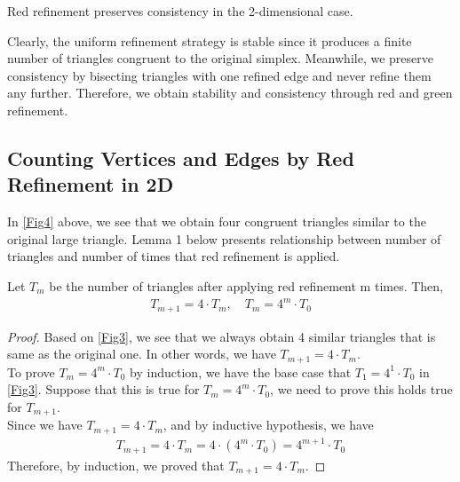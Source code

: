     \begin{lemma*}
    Red refinement preserves consistency in the 2-dimensional case.
    \end{lemma*}


    Clearly, the uniform refinement strategy is stable since it produces a finite number of triangles congruent to the original simplex. Meanwhile, we preserve consistency by bisecting triangles with one refined edge and never refine them any further. Therefore, we obtain stability and consistency through red and green refinement.

    \subsection{Counting Vertices and Edges by Red Refinement in 2D}
    In \ref{Fig4} above, we see that we obtain four congruent triangles similar to the original large triangle. Lemma 1 below presents relationship between number of triangles and number of times that red refinement is applied.

    \begin{lemma}
    Let $T_{m}$ be the number of triangles after applying red refinement m times. Then,
    \begin{align*}
    T_{m+1} = 4 \cdot T_{m}, \quad T_{m} = 4^m \cdot T_0
    \end{align*}
    \end{lemma}
    \begin{proof}
    Based on \ref{Fig3}, we see that we always obtain 4 similar triangles that is same as the original one. In other words, we have $T_{m+1} = 4 \cdot T_{m}$.\\
    To prove $T_{m} = 4^m \cdot T_0$ by induction, we have the base case that $T_1 = 4^1 \cdot T_0$ in \ref{Fig3}. Suppose that this is true for $T_{m} = 4^m \cdot T_0$, we need to prove this holds true for $T_{m+1}$.\\
    Since we have $T_{m+1} = 4 \cdot T_{m}$, and by inductive hypothesis, we have
    \begin{align*}
    T_{m+1} = 4 \cdot T_{m} = 4 \cdot (4^m\cdot T_0) = 4^{m+1}\cdot T_0
    \end{align*}
    Therefore, by induction, we proved that $T_{m+1} = 4 \cdot T_{m}$.
    \end{proof}

